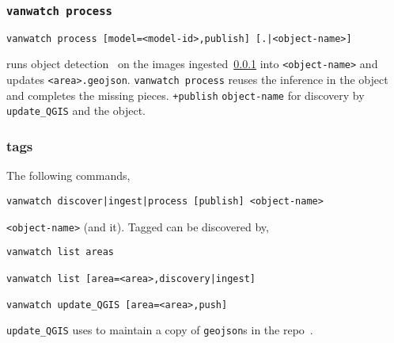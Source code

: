 \subsubsection{\texttt{vanwatch process}}
\label{vanwatch_process}

\begin{verbatim}
vanwatch process [model=<model-id>,publish] [.|<object-name>]
\end{verbatim}
%
runs object detection~ on the images ingested~\ref{vanwatch_process} into \texttt{<object-name>} and updates \texttt{<area>.geojson}. \texttt{vanwatch process} reuses the inference in the object and completes the missing pieces. \texttt{+publish}  \texttt{object-name} for discovery by \texttt{update\_QGIS} and  the object.

\subsubsection{tags}
\label{vanwatch_tags}

The following commands,

\begin{verbatim}
vanwatch discover|ingest|process [publish] <object-name>
\end{verbatim}
%
 \texttt{<object-name>} (and  it). Tagged  can be discovered by,
%
\begin{verbatim}
vanwatch list areas

vanwatch list [area=<area>,discovery|ingest]

vanwatch update_QGIS [area=<area>,push]
\end{verbatim}
%
\texttt{update\_QGIS} uses  to maintain a copy of \texttt{geojson}s in the repo~.